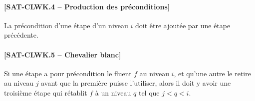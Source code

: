 {%
\paragraph*{[SAT-CLWK.4 -- Production des préconditions]} La précondition d'une étape d'un niveau
  $i$ doit être ajoutée par une étape précédente.

\paragraph*{[SAT-CLWK.5 -- Chevalier blanc]} Si une étape a pour précondition le fluent $f$
  au niveau $i$, et qu'une autre le retire au niveau $j$ avant que la première
  puisse l'utiliser, alors il doit y avoir une troisième étape qui rétablit $f$
  à un niveau $q$ tel que $j < q < i$.

} %
